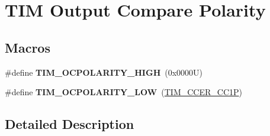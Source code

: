 \hypertarget{group___t_i_m___output___compare___polarity}{}\section{T\+IM Output Compare Polarity}
\label{group___t_i_m___output___compare___polarity}
\subsection*{Macros}
\begin{DoxyCompactItemize}
\item 
\mbox{\label{group___t_i_m___output___compare___polarity_ga5887380660b742f0045e9695914231b8}} 
\#define {\bfseries T\+I\+M\+\_\+\+O\+C\+P\+O\+L\+A\+R\+I\+T\+Y\+\_\+\+H\+I\+GH}~(0x0000\+U)
\item 
\mbox{\label{group___t_i_m___output___compare___polarity_ga1daff1574b0a2d17ccc9ae40a649ac37}} 
\#define {\bfseries T\+I\+M\+\_\+\+O\+C\+P\+O\+L\+A\+R\+I\+T\+Y\+\_\+\+L\+OW}~(\hyperlink{group___peripheral___registers___bits___definition_ga0ca0aedba14241caff739afb3c3ee291}{T\+I\+M\+\_\+\+C\+C\+E\+R\+\_\+\+C\+C1P})
\end{DoxyCompactItemize}


\subsection{Detailed Description}
